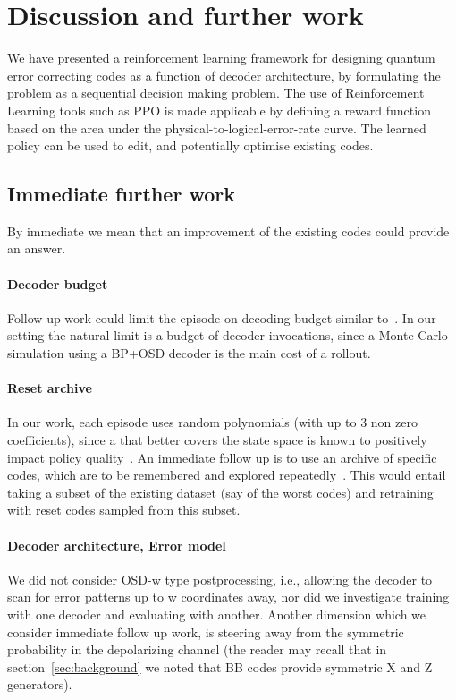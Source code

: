\section{Discussion and further work\label{sec:conclusion}}
We have presented a reinforcement learning framework for designing quantum error correcting codes as a function of decoder architecture, by formulating the problem as a sequential decision making problem.
The use of Reinforcement Learning tools such as PPO is made applicable by defining a reward function based on the area under the physical-to-logical-error-rate curve.
The learned policy can be used to edit, and potentially optimise existing codes. 

\subsection{Immediate further work}
By immediate we mean that an improvement of the existing codes could provide an answer.
\paragraph{Decoder budget} Follow up work could limit the episode on decoding budget similar to~\cite{pardo2018time}.
In our setting the natural limit is a budget of decoder invocations, since a Monte-Carlo simulation using a BP+OSD decoder is the main cost of a rollout.
\paragraph{Reset archive} In our work, each episode  uses random polynomials (with up to 3 non zero coefficients), since 
a  that better covers the state space is known to positively impact policy quality~\cite{kakade2002approximately}. 
An immediate follow up is to use an archive of specific codes, 
which are to be remembered and explored repeatedly~\cite{ecoffet2021first}. This would entail taking a subset of the existing dataset (say of the worst codes) and retraining with reset codes sampled from this subset.
\paragraph{Decoder architecture, Error model}We did not consider OSD-w type postprocessing, i.e., allowing the decoder to scan for error patterns up to w coordinates away, nor did we investigate training with one decoder and evaluating with another. Another dimension which we consider immediate follow up work, is steering away from the symmetric probability in the depolarizing channel (the reader may recall that in section~\ref{sec:background} we noted that BB codes provide symmetric X and Z generators).

